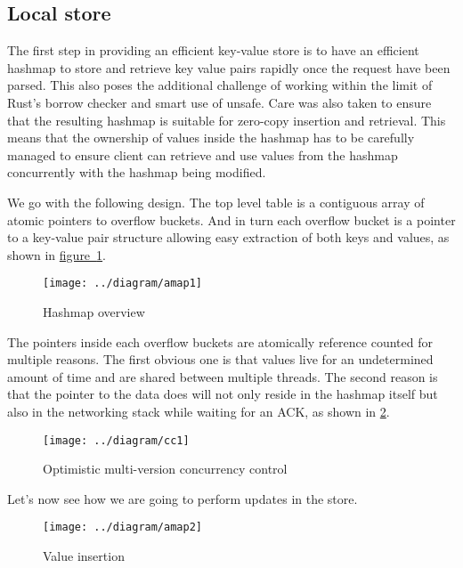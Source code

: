 \documentclass[11pt]{article}
\begin{document}
\subsection{Local store} \label{design-overview}

The first step in providing an efficient key-value store is to
have an efficient hashmap to store and retrieve key value pairs
rapidly once the request have been parsed. This also poses the
additional challenge of working within the limit of Rust's borrow
checker and smart use of unsafe. Care was also taken to ensure that
the resulting hashmap is suitable for zero-copy insertion and
retrieval. This means that the ownership of values inside the hashmap
has to be carefully managed to ensure client can retrieve and use
values from the hashmap concurrently with the hashmap being modified.

We go with the following design. The top level table is a contiguous
array of atomic pointers to overflow buckets. And in turn each
overflow bucket is a pointer to a key-value pair structure allowing
easy extraction of both keys and values, as shown in
\hyperref[fig:hashmap]{figure~\ref*{fig:hashmap}}.

\begin{figure}[htb!]
  \texttt{[image: ../diagram/amap1]}
  \caption{Hashmap overview}
  \label{fig:hashmap}
\end{figure}

The pointers inside each overflow buckets are atomically reference
counted for multiple reasons. The first obvious one is that values
live for an undetermined amount of time and are shared between
multiple threads. The second reason is that the pointer to the data
does will not only reside in the hashmap itself but also in the
networking stack while waiting for an ACK, as shown in
\ref{fig:omvcc}.

\begin{figure}[htb!]
  \texttt{[image: ../diagram/cc1]}
  \caption{Optimistic multi-version concurrency control}
  \label{fig:omvcc}
\end{figure}

Let's now see how we are going to perform updates in the store.

\begin{figure}[htb!]
  \texttt{[image: ../diagram/amap2]}
  \caption{Value insertion}
  \label{fig:omvcc-insert}
\end{figure}
\end{document}
